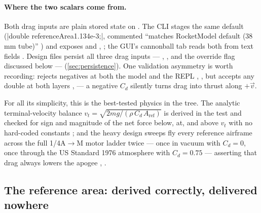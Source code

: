 \paragraph{Where the two scalars come from.} Both drag inputs are plain stored state on
. The CLI stages the same default (\cppinline|double referenceArea{1.134e-3};|,
commented ``matches RocketModel default (38 mm tube)'' ) and exposes
 and  , ; the
GUI's cannonball tab reads both from text fields . Design
files persist all three drag inputs --- , , and
the override flag discussed below --- 
(\cref{sec:persistence}). One validation asymmetry is worth recording:
 rejects negatives at both the model and the REPL
, , but 
accepts any double at both layers ,  ---
a negative $C_d$ silently turns drag into thrust along $+\vec{v}$.

For all its simplicity, this is the best-tested physics in the tree. The analytic
terminal-velocity balance $v_t = \sqrt{2mg/(\rho\,C_d\,A_{\mathrm{ref}})}$ is derived in the
test and checked for sign and magnitude of the net force below, at, and above $v_t$ with no
hard-coded constants ; and the heavy design
sweeps fly every reference airframe across the full 1/4A$\to$M motor ladder twice --- once in
vacuum with $C_d = 0$, once through the US Standard 1976 atmosphere with $C_d = 0.75$ ---
asserting that drag always lowers the apogee ,
.

\subsection{The reference area: derived correctly, delivered nowhere}\label{sec:aero-refarea}

